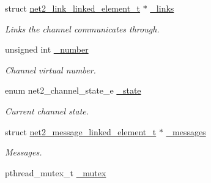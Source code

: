 \begin{DoxyCompactItemize}
\item 
\hypertarget{structnet2__channel__input__t_a361553649d82ea4d450721ba7578cf5c}{}struct \hyperlink{structnet2__link__linked__element__t}{net2\+\_\+link\+\_\+linked\+\_\+element\+\_\+t} $\ast$ \hyperlink{structnet2__channel__input__t_a361553649d82ea4d450721ba7578cf5c}{\+\_\+links}\label{structnet2__channel__input__t_a361553649d82ea4d450721ba7578cf5c}

\begin{DoxyCompactList}\small\item\em Links the channel communicates through. \end{DoxyCompactList}\item 
\hypertarget{structnet2__channel__input__t_aad432fed1cbfe759ef2d473ab8f47109}{}unsigned int \hyperlink{structnet2__channel__input__t_aad432fed1cbfe759ef2d473ab8f47109}{\+\_\+number}\label{structnet2__channel__input__t_aad432fed1cbfe759ef2d473ab8f47109}

\begin{DoxyCompactList}\small\item\em Channel virtual number. \end{DoxyCompactList}\item 
\hypertarget{structnet2__channel__input__t_a3363f7063e071be71e1320617a870b84}{}enum net2\+\_\+channel\+\_\+state\+\_\+e \hyperlink{structnet2__channel__input__t_a3363f7063e071be71e1320617a870b84}{\+\_\+state}\label{structnet2__channel__input__t_a3363f7063e071be71e1320617a870b84}

\begin{DoxyCompactList}\small\item\em Current channel state. \end{DoxyCompactList}\item 
\hypertarget{structnet2__channel__input__t_a62adebf1311e1002e0f5a67fa00ea1a0}{}struct \hyperlink{structnet2__message__linked__element__t}{net2\+\_\+message\+\_\+linked\+\_\+element\+\_\+t} $\ast$ \hyperlink{structnet2__channel__input__t_a62adebf1311e1002e0f5a67fa00ea1a0}{\+\_\+messages}\label{structnet2__channel__input__t_a62adebf1311e1002e0f5a67fa00ea1a0}

\begin{DoxyCompactList}\small\item\em Messages. \end{DoxyCompactList}\item 
\hypertarget{structnet2__channel__input__t_a9d656c00ee2f6d89286272487bac4ec3}{}pthread\+\_\+mutex\+\_\+t \hyperlink{structnet2__channel__input__t_a9d656c00ee2f6d89286272487bac4ec3}{\+\_\+mutex}\label{structnet2__channel__input__t_a9d656c00ee2f6d89286272487bac4ec3}


\end{DoxyCompactItemize}
